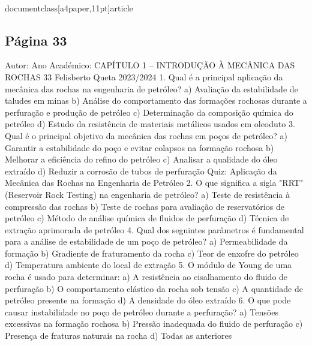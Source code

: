 \\documentclass[a4paper,11pt]{article}
\begin{document}
\subsection*{Página 33}
Autor:
Ano Académico:
CAPÍTULO 1 – INTRODUÇÃO À MECÂNICA DAS ROCHAS
33
Felisberto Queta
2023/2024
1. Qual é a principal aplicação da mecânica das rochas na engenharia de petróleo?
a) Avaliação da estabilidade de taludes em minas
b) Análise do comportamento das formações rochosas durante a perfuração e produção de petróleo
c) Determinação da composição química do petróleo
d) Estudo da resistência de materiais metálicos usados em oleoduto
3. Qual é o principal objetivo da mecânica das rochas em poços de petróleo?
a) Garantir a estabilidade do poço e evitar colapsos na formação rochosa
b) Melhorar a eficiência do refino do petróleo
c) Analisar a qualidade do óleo extraído
d) Reduzir a corrosão de tubos de perfuração
Quiz: Aplicação da 
Mecânica das 
Rochas na 
Engenharia de 
Petróleo
2. O que significa a sigla "RRT" (Reservoir Rock Testing) na engenharia de petróleo?
a) Teste de resistência à compressão das rochas
b) Teste de rochas para avaliação de reservatórios de petróleo
c) Método de análise química de fluidos de perfuração
d) Técnica de extração aprimorada de petróleo
4. Qual dos seguintes parâmetros é fundamental para a análise de estabilidade de um poço de petróleo?
a) Permeabilidade da formação
b) Gradiente de fraturamento da rocha
c) Teor de enxofre do petróleo
d) Temperatura ambiente do local de extração
5. O módulo de Young de uma rocha é usado para determinar:
a) A resistência ao cisalhamento do fluido de perfuração
b) O comportamento elástico da rocha sob tensão
c) A quantidade de petróleo presente na formação
d) A densidade do óleo extraído
6. O que pode causar instabilidade no poço de petróleo durante a perfuração?
a) Tensões excessivas na formação rochosa
b) Pressão inadequada do fluido de perfuração
c) Presença de fraturas naturais na rocha
d) Todas as anteriores
\end{document}
